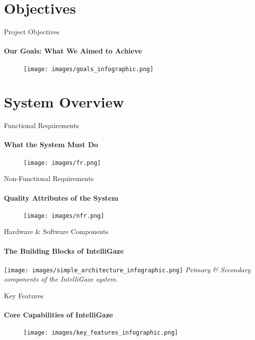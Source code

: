 \documentclass[10pt]{beamer}
\begin{document}
\section{Objectives}
\begin{frame}{Project Objectives}
    \framesubtitle{Our Goals: What We Aimed to Achieve}
    \begin{figure}
        \centering
        \texttt{[image: images/goals\_infographic.png]}
    \end{figure}
\end{frame}

\section{System Overview}

\begin{frame}{Functional Requirements}
    \framesubtitle{What the System Must Do}
    \begin{figure}
        \centering
        \texttt{[image: images/fr.png]}
    \end{figure}
\end{frame}

\begin{frame}{Non-Functional Requirements}
    \framesubtitle{Quality Attributes of the System}
     \begin{figure}
        \centering
        \texttt{[image: images/nfr.png]}
    \end{figure}
\end{frame}

\begin{frame}{Hardware \& Software Components}
    \framesubtitle{The Building Blocks of IntelliGaze}
        \centering
        \texttt{[image: images/simple\_architecture\_infographic.png]}
        \centering \textit{Primary \& Secondary components of the IntelliGaze system.}
\end{frame}

\begin{frame}{Key Features}
    \framesubtitle{Core Capabilities of IntelliGaze}
    \begin{figure}
        \centering
        \texttt{[image: images/key\_features\_infographic.png]}
    \end{figure}
\end{frame}
\end{document}
